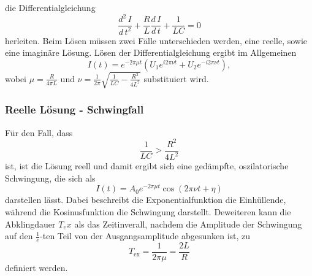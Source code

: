         \\ \\
        die Differentialgleichung 
        \begin{equation}
            \label{eqn:diffgleichung}
            \frac{d^2 \, I}{d \, t^2} + \frac{R}{L} \frac{d \, I}{d \, t} + \frac {1}{L C} = 0
        \end{equation}
        herleiten. Beim Lösen müssen zwei Fälle unterschieden werden, eine reelle, sowie eine imaginäre Lösung. 
        Lösen der Differentialgleichung ergibt im Allgemeinen
        \begin{equation} %
            \label{eqn:strom_allgemein}
            I(t) = e^{-2 \pi \mu t} (U_1 e^{i 2 \pi \nu t} + U_2 e^{-i 2 \pi \nu t}),
        \end{equation}
        wobei $\mu = \frac{R}{4 \pi L} $ und $\nu = \frac{1}{2 \pi} \sqrt{\frac{1}{L C} - \frac{R^2}{4 L^2} }$
        substituiert wird.
        \subsubsection{Reelle Lösung - Schwingfall}
            Für den Fall, dass
            \begin{equation}
                \label{eqn:bedingung_reell}
                \frac{1}{L C} > \frac{R^2}{4 L^2}
            \end{equation}
            ist, ist die Lösung reell und damit ergibt sich eine gedämpfte, oszilatorische Schwingung, die sich als
            \begin{equation}
                \label{eqn:reell_lösung}
                I(t) = A_0 e^{-2 \pi \mu t} \cos(2 \pi \nu t + \eta)
            \end{equation}
            darstellen lässt. Dabei beschreibt die Exponentialfunktion die Einhüllende, während die Kosinusfunktion die Schwingung darstellt.
            Deweiteren kann die Abklingdauer $T_ex$ als das Zeitinverall, nachdem die Amplitude der Schwingung auf den $\frac{1}{e}$-ten Teil
            von der Ausgangsamplitude abgesunken ist, zu
            \begin{equation}
                \label{eqn:abklingdauer}
                T_\text{ex} = \frac{1}{2 \pi \mu} = \frac{2 L}{R}
            \end{equation}
            definiert werden.

